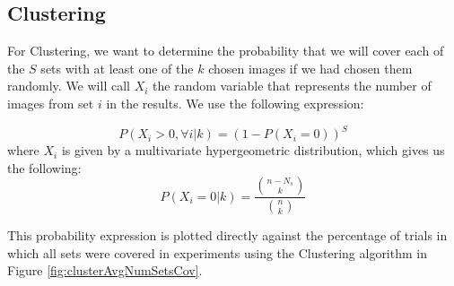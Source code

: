 
\subsection{Clustering}
For Clustering, we want to determine the probability that we will cover each of the $S$ sets with at least one of the $k$ chosen images if we had chosen them randomly.  We will call $X_i$ the random variable that represents the number of images from set $i$ in the results.  We use the following expression:

\begin{equation}
	P( X_i > 0 , \forall i | k) = (1 - P(X_i = 0))^{S}
\end{equation}
where $X_i$ is given by a multivariate hypergeometric distribution, which gives us the following:
\begin{equation}
	P(X_i = 0 | k) = \frac{{n-N_s \choose k}}{{n \choose k}}
\end{equation}

This probability expression is plotted directly against the percentage of trials in which all sets were covered in experiments using the Clustering algorithm in Figure \ref{fig:clusterAvgNumSetsCov}.



